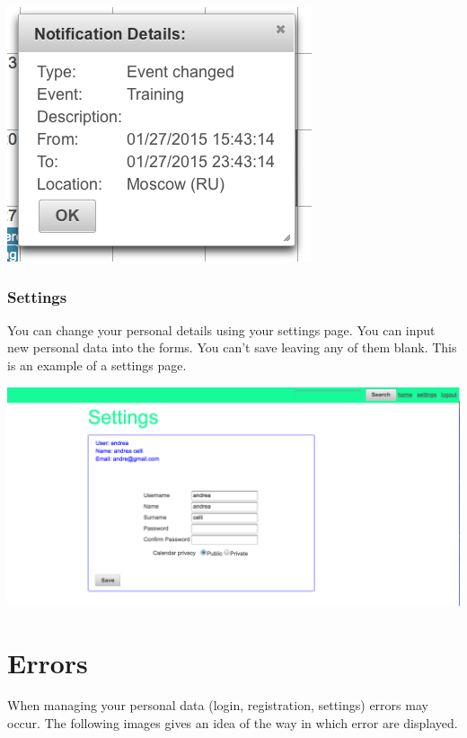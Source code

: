 \documentclass[10pt,a4paper,titlepage]{article}
\begin{document}
\begin{center}
\includegraphics[width=0.7\linewidth]{./images/28_event_changed_notification}
\end{center}

\section{Settings}
You can change your personal details using your settings page. You can input new personal data into the forms. You can’t save leaving any of them blank. This is an example of a settings page.

\begin{center}
\includegraphics[width=\linewidth]{./images/29_settings}
\end{center}

\part{Errors}
When managing your personal data (login, registration, settings) errors may occur. The following images gives an idea of the way in which error are displayed.
\end{document}
